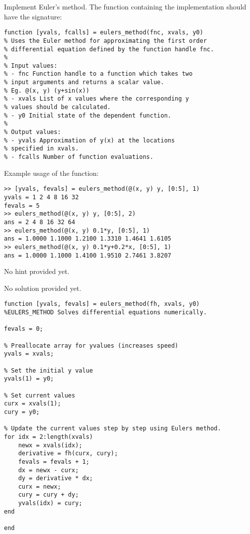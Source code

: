 \begin{ex}%
Implement Euler's method.
The function containing the implementation should
have the signature:
\begin{lstlisting}
function [yvals, fcalls] = eulers_method(fnc, xvals, y0)
% Uses the Euler method for approximating the first order
% differential equation defined by the function handle fnc.
%
% Input values:
% - fnc Function handle to a function which takes two
% input arguments and returns a scalar value.
% Eg. @(x, y) (y+sin(x))
% - xvals List of x values where the corresponding y
% values should be calculated.
% - y0 Initial state of the dependent function.
%
% Output values:
% - yvals Approximation of y(x) at the locations
% specified in xvals.
% - fcalls Number of function evaluations.
\end{lstlisting}
Example usage of the function:
\begin{lstlisting}
>> [yvals, fevals] = eulers_method(@(x, y) y, [0:5], 1)
yvals = 1 2 4 8 16 32
fevals = 5
>> eulers_method(@(x, y) y, [0:5], 2)
ans = 2 4 8 16 32 64
>> eulers_method(@(x, y) 0.1*y, [0:5], 1)
ans = 1.0000 1.1000 1.2100 1.3310 1.4641 1.6105
>> eulers_method(@(x, y) 0.1*y+0.2*x, [0:5], 1)
ans = 1.0000 1.1000 1.4100 1.9510 2.7461 3.8207
\end{lstlisting}
\begin{hint}
No hint provided yet.
\end{hint}
\begin{sol}
No solution provided yet.
\begin{lstlisting}
function [yvals, fevals] = eulers_method(fh, xvals, y0)
%EULERS_METHOD Solves differential equations numerically.

fevals = 0;

% Preallocate array for yvalues (increases speed)
yvals = xvals;

% Set the initial y value
yvals(1) = y0;

% Set current values
curx = xvals(1);
cury = y0;

% Update the current values step by step using Eulers method.
for idx = 2:length(xvals)
    newx = xvals(idx);
    derivative = fh(curx, cury);
    fevals = fevals + 1;
    dx = newx - curx;
    dy = derivative * dx;
    curx = newx;
    cury = cury + dy;
    yvals(idx) = cury;
end

end
\end{lstlisting}
\end{sol}
\end{ex}

